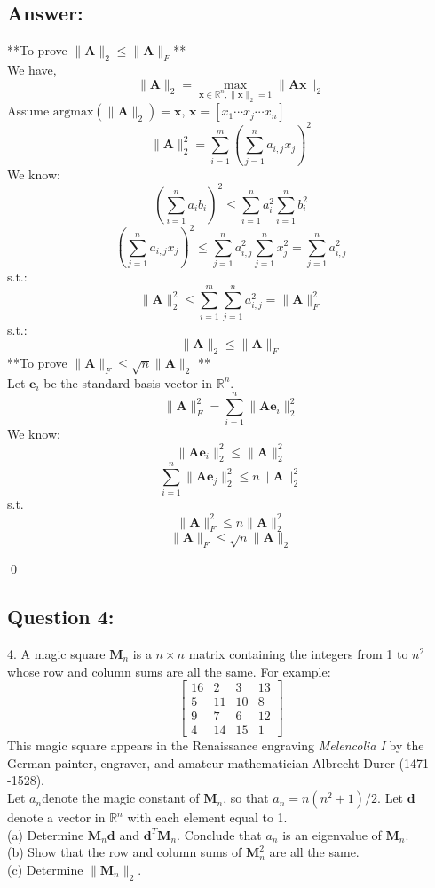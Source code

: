 \documentclass{article}
\newcommand{\R}{\mathbb{R}}
\renewenvironment{proof}{\begin{addmargin}[1em]{0em}\begin{newproof}}
{\end{newproof}\end{addmargin}\qed}
\begin{document}
\subsection*{Answer:}
\begin{proof}
    **To prove \(\|\bm{A}\|_2 \leq \|\bm{A}\|_F\)** \\
    We have,
    \[
    \|\bm{A}\|_2 = \max_{\bm{x} \in \R^n, \|\bm{x}\|_2 = 1}\|\bm{Ax}\|_2
    \]
    Assume \(\text{argmax} (\|\bm{A} \|_2) = \bm{x}\), \(\bm{x} = [x_1 \cdots x_j \cdots x_n]\)
    \[
    \|\bm{A}\|_2^2 = \sum_{i=1}^m \left(\sum_{j=1}^na_{i, j} x_{j}\right)^2
    \]
    We know:
    \[
    \left( \sum_{i=1}^n a_i b_i \right)^2 \leq \sum_{i=1}^n a_i^2 \sum_{i=1}^n b_i^2
    \]
    \[
    \left(\sum_{j=1}^n a_{i, j}x_j \right)^2 \leq \sum_{j=1}^na_{i,j}^2 \sum_{j=1}^n x_j^2 = \sum_{j=1}^n a_{i,j}^2
    \]
    s.t.:
    \[
    \|\bm{A}\|_2^2 \leq \sum_{i=1}^m \sum_{j=1}^n a_{i, j}^2 = \|\bm{A}\|_F^2
    \]
    s.t.:
    \[
    \|\bm{A}\|_2 \leq \|\bm{A}\|_F
    \]
    **To prove \(\|\bm{A}\|_F \leq \sqrt{n}\|\bm{A}\|_2\) **    \\
    Let \(\bm{e}_i\) be the standard basis vector in \(\R^n\). \\
    \[
    \|\bm{A}\|_F^2 = \sum_{i=1}^n \|\bm{Ae}_i\|_2^2
    \]
    We know:
    \[
    \|\bm{Ae}_i\|_2^2 \leq \|\bm{A}\|_2^2
    \]
    \[
    \sum_{i=1}^n\|\bm{Ae}_j\|_2^2 \leq n\|\bm{A}\|_2^2
    \]
    s.t.
    \[
    \|\bm{A}\|_F^2 \leq n\|\bm{A}\|_2^2
    \]
    \[
    \|\bm{A}\|_F \leq \sqrt{n}\|\bm{A}\|_2
    \]
\end{proof}

\subsection*{Question 4:}
4. A magic square \(\bm{M}_n\) is a \(n \times n\) matrix containing the integers from 1 to \(n^2\) whose row and column sums are all the same. For example: \\
\[
\begin{bmatrix}
    16 & 2 & 3 & 13 \\
    5 & 11 & 10 & 8 \\
    9 & 7 & 6 & 12 \\
    4 & 14 & 15 & 1
\end{bmatrix}
\]
This magic square appears in the Renaissance engraving \textit{Melencolia I} by the German painter, engraver, and amateur mathematician Albrecht Durer (1471 -1528). \\
Let \(a_n\)denote the magic constant of \(\bm{M}_n\), so that \(a_n = n(n^2 + 1)/2\). Let \(\bm{d}\) denote a vector in \(\R^n\) with each element equal to 1.\\
(a) Determine \(\bm{M}_n\bm{d}\) and \(\bm{d}^T\bm{M}_n\). Conclude that \(a_n\) is an eigenvalue of \(\bm{M}_n\). \\
(b) Show that the row and column sums of \(\bm{M}_n^2\) are all the same. \\
(c) Determine \(\|\bm{M}_n\|_2\).
\end{document}
